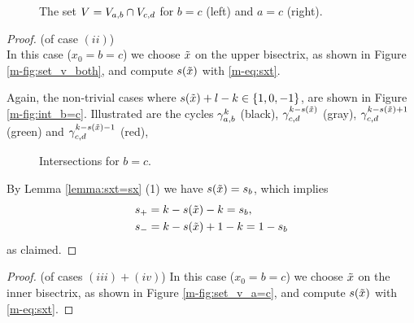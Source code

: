 \documentclass[main.tex]{subfiles}
\begin{document}
    \begin{figure}[H]
      \begin{center}
   \scalebox{.9}{}
      \end{center}
     \vspace{-1cm}
    \caption{The set $V = V_{a,b} \cap V_{c,d}$ for $b=c$ (left) and $a=c$ (right).}
    \label{fig:set_v_b=c}
\end{figure}
   
   
   
   
   
   \begin{proof}\let\qed\relax (of case $(ii)$) \\
   In this case ($x_0 = b = c$) we choose $\tilde{x}$ on the upper bisectrix, as shown in Figure \ref{m-fig:set_v_both}, 
   and compute $s(\tilde{x})$ with \eqref{m-eq:sxt}.
   
   Again, the non-trivial cases where $s(\tilde{x}) + l - k \in \{1,0,-1\}$, are shown in Figure \ref{m-fig:int_b=c}.
   Illustrated are the cycles $\gamma_{a,b}^k$ (black), $\gamma_{c,d}^{k-s(\tilde{x})}$ (gray), $\gamma_{c,d}^{k-s(\tilde{x}) + 1 }$ (green) and
    $\gamma_{c,d}^{k-s(\tilde{x})-1}$ (red),
    \begin{figure}[H]
      \begin{center}
   
      \end{center}
    \caption{Intersections for $b=c$.}
    \label{fig:int_b=c}
   \end{figure}
    By Lemma \ref{lemma:sxt=sx} (1) we have $s(\tilde{x}) = s_b$, which implies
    \begin{align*}
    & s_+ = k-s(\tilde{x})-k = s_b, \\
    & s_- = k-s(\tilde{x})+1-k = 1-s_b
    \end{align*}
  as claimed.
  \end{proof}
 
%    
   
 
 
 \begin{proof}(of cases $(iii) + (iv)$)
 In this case ($x_0 = b = c$) we choose $\tilde{x}$ on the inner bisectrix, as shown in Figure \ref{m-fig:set_v_a=c}, 
   and compute $s(\tilde{x})$ with \eqref{m-eq:sxt}.
 \end{proof}
\end{document}
